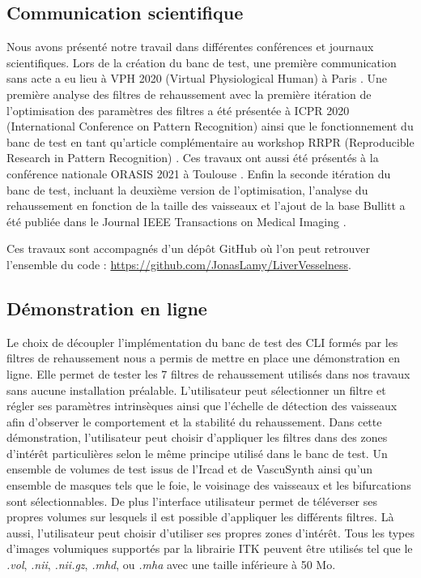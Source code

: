 \subsection{Communication scientifique}
Nous avons présenté notre travail dans différentes conférences et journaux scientifiques. Lors de la création du banc de test, une première communication sans acte a eu lieu à VPH 2020 (Virtual Physiological Human) à Paris \cite{Lamy2020_VPH_bench}. Une première analyse des filtres de rehaussement avec la première itération de l'optimisation des paramètres des filtres a été présentée à ICPR 2020 (International Conference on Pattern Recognition) \cite{Lamy2020_ICPR} ainsi que le fonctionnement du banc de test en tant qu'article complémentaire au workshop RRPR (Reproducible Research in Pattern Recognition) \cite{Lamy2021_RRPR}. Ces travaux ont aussi été présentés à la  conférence nationale ORASIS 2021 à Toulouse \cite{Lamy2021_ORASIS}. Enfin la seconde itération du banc de test, incluant la deuxième version de l'optimisation, l'analyse du rehaussement en fonction de la taille des vaisseaux et l'ajout de la base Bullitt a été publiée dans le Journal IEEE Transactions on Medical Imaging \cite{Lamy2022_TMI}.

Ces travaux sont accompagnés d'un dépôt GitHub où l'on peut retrouver l'ensemble du code : \url{https://github.com/JonasLamy/LiverVesselness}. 


\subsection{Démonstration en ligne}

Le choix de découpler l'implémentation du banc de test des CLI formés par les filtres de rehaussement nous a permis de mettre en place une démonstration en ligne. Elle permet de tester les 7 filtres de rehaussement utilisés dans nos travaux sans aucune installation préalable. L'utilisateur peut sélectionner un filtre et régler ses paramètres intrinsèques ainsi que l'échelle de détection des vaisseaux afin d'observer le comportement et la stabilité du rehaussement. Dans cette démonstration, l'utilisateur peut choisir d'appliquer les filtres dans des zones d'intérêt particulières selon le même principe utilisé dans le banc de test. Un ensemble de volumes de test issus de l'Ircad et de VascuSynth ainsi qu'un ensemble de masques tels que le foie, le voisinage des vaisseaux et les bifurcations sont sélectionnables. De plus l'interface utilisateur permet de téléverser ses propres volumes sur lesquels il est possible d’appliquer les différents filtres. Là aussi, l'utilisateur peut choisir d'utiliser ses propres zones d'intérêt. Tous les types d'images volumiques supportés par la librairie ITK peuvent être utilisés tel que le \textit{.vol}, \textit{.nii}, \textit{.nii.gz}, \textit{.mhd}, ou \textit{.mha} avec une taille inférieure à 50 Mo.

